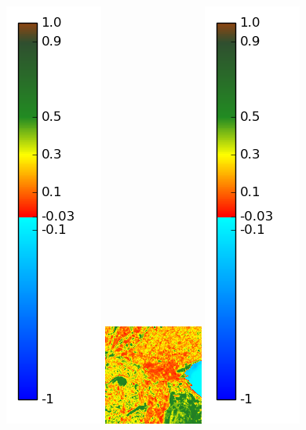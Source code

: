 \documentclass{book}
\begin{document}
\begin{figure}[H]
{\includegraphics[scale=0.2]{images/colormap.png}
\includegraphics[scale=0.7]{images/Annecy/05_ndvi.png}
\includegraphics[scale=0.2]{images/colormap.png}
}
\end{figure}
\end{document}

